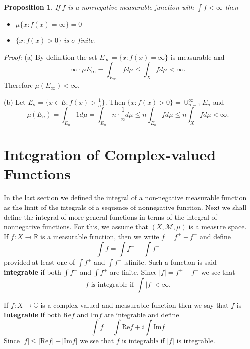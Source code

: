 \documentclass[12pt]{report}
\newtheorem{prop}[theorem]{Proposition}
\begin{document}
\begin{prop} If $f$ is a nonnegative measurable function with $\int f <
\infty$ then 
\begin{itemize}
\item[a)]  $\mu\{x: f(x) = \infty \} = 0$
\item[b)]  $\{x: f(x) > 0\}$\textit{ is } $\sigma$-finite.
\end{itemize}
\end{prop}
\textit{Proof:}
(a)  By definition the set $E_\infty = \{x: f(x) = \infty \}$ is
measurable and 
\[
\infty \cdot \mu E_\infty = \int_{E_\infty} f d\mu \le \int_X f d \mu <
\infty.
\] Therefore $\mu(E_\infty) < \infty$.

\smallskip
\noindent
(b)  Let $E_n = \{x \in E: f(x) > \frac{1}{n} \}$.  Then $\{x: f(x) > 0\} =
{\cup}^\infty_{n=1} E_n$ and 
\[
\mu(E_n) = \int_{E_n} 1 d \mu = \int_{E_n} n \cdot \frac{1}{n} d \mu \le
n \int_{E_n} f d \mu \le n \int_X f d \mu < \infty.
\]



\section{Integration of Complex-valued Functions}
In the last section we defined the integral of a non-negative
measurable function as the limit of the integrals of a sequence of
nonnegative  function.  Next we shall define the integral of more
general functions in terms of the integral of nonnegative functions. 
For this, we assume that $(X, \mathcal{M}, \mu)$ is a measure  space.  If
$f: X \longrightarrow \bar{\mathbb{R}}$ is a measurable function, then
we write  $f = f^+ - f^-$ and define
\begin{equation}\label{eq:general-int}
\int f = \int f^+ - \int f^-
\end{equation}
 provided at least one of $\int f^+$ and $\int f^-$ isfinite.  
Such a function is said
\textbf{integrable} if both $\int f^-$ and $\int f^+$ are finite.  Since  $|f|
= f^+ + f^-$ we see that 
\begin{equation}\label{eq:int-funct}
f \mbox{ is integrable if } \int |f| < \infty.
\end{equation}

If $f: X \longrightarrow \mathbb{C}$ is a complex-valued and
measurable function then we say that $f$ is \textbf{integrable} if both
Re$f$ and Im$f$ are integrable and define
\[
\int f = \int \mbox{Re}f + i \int \mbox{Im} f
\] Since $|f| \le |\mbox{Re}f| + |\mbox{Im}f|$ we see that $f$ is integrable
if $|f|$ is integrable.
\end{document}
